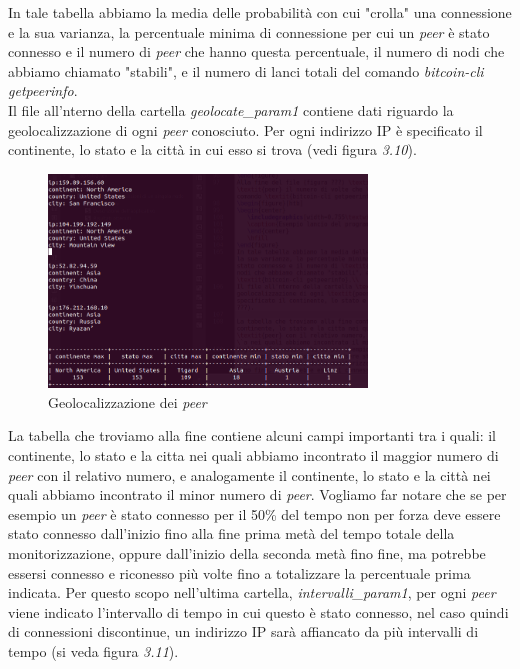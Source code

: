 In tale tabella abbiamo la media delle probabilit\`a con cui "crolla" una connessione e la sua varianza, la percentuale minima di connessione per cui un \textit{peer} \`e stato connesso e il numero di \textit{peer} che hanno questa percentuale, il numero di nodi che abbiamo chiamato "stabili", e il numero di lanci totali del comando \textit{bitcoin-cli getpeerinfo}.\\
Il file all'nterno della cartella \textit{geolocate\_param1} contiene dati riguardo la geolocalizzazione di ogni \textit{peer} conosciuto. Per ogni indirizzo IP \`e specificato il continente, lo stato e la citt\`a in cui esso si trova (vedi figura \textit{3.10}).
\begin{figure}[htb]
\begin{center}
   \includegraphics[width=0.755\textwidth]{imgs/geolocate.png}
   \caption{Geolocalizzazione dei \textit{peer}}
   \end{center}
   \hfill
\end{figure}
La tabella che troviamo alla fine contiene alcuni campi importanti tra i quali: il continente, lo stato e la citta nei quali abbiamo incontrato il maggior numero di \textit{peer} con il relativo numero, e analogamente il continente, lo stato e la citt\`a nei quali abbiamo incontrato il minor numero di \textit{peer}.
Vogliamo far notare che se per esempio un \textit{peer} \`e stato connesso per il 50\% del tempo non per forza deve essere stato connesso dall'inizio fino alla fine prima met\`a del tempo totale della monitorizzazione, oppure dall'inizio della seconda met\`a fino fine, ma potrebbe essersi connesso e riconesso pi\`u volte fino a totalizzare la percentuale prima indicata.
Per questo scopo nell'ultima cartella, \textit{intervalli\_param1}, per ogni \textit{peer} viene indicato l'intervallo di tempo in cui questo \`e stato connesso, nel caso quindi di connessioni discontinue, un indirizzo IP sar\`a affiancato da pi\`u intervalli di tempo (si veda figura \textit{3.11}).
